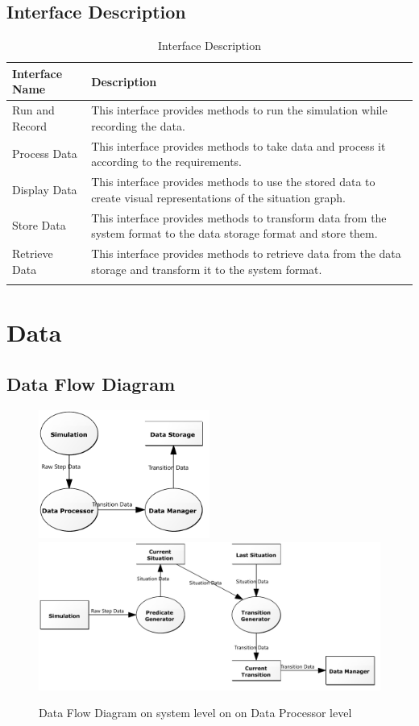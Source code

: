 \documentclass[a4paper, 11pt]{scrreprt}
\begin{document}
	\section{Interface Description}

	\begin{longtabu}{|X[-1,m]|X[l,m]|}
		\hline
		\rowfont[l]{\bfseries} Interface Name & Description \\ \hline
		Run and Record & This interface provides methods to run the simulation while recording the data.\\ \hline
		Process Data & This interface provides methods to take data and process it according to the requirements.\\ \hline
		Display Data & This interface provides methods to use the stored data to create visual representations of the situation graph.\\ \hline
		Store Data & This interface provides methods to transform data from the system format to the data storage format and store them.\\ \hline
		Retrieve Data & This interface provides methods to retrieve data from the data storage and transform it to the system format.\\ \hline
		\caption{Interface Description}
	\end{longtabu}
	
	\chapter{Data}
	\section{Data Flow Diagram}
		
		\begin{figure}[H]
			\centering
			\includegraphics[width=0.5\textwidth]{DataFlowDiagramSystem}
			\includegraphics[width=\textwidth]{DataFlowDiagramDataProcessor}
			\caption{Data Flow Diagram on system level on on Data Processor level}
			\label{fig:data_flow_diagram_record}
		\end{figure}
		
\end{document}
